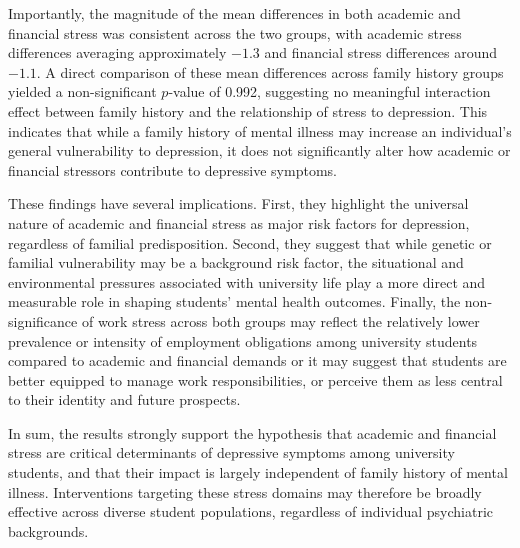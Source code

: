 \documentclass[conference]{IEEEtran}
\begin{document}
Importantly, the magnitude of the mean differences in both academic and financial stress was consistent across the two groups, with academic stress differences averaging approximately $-1.3$ and financial stress differences around $-1.1$. A direct comparison of these mean differences across family history groups yielded a non-significant $p$-value of 0.992, suggesting no meaningful interaction effect between family history and the relationship of stress to depression. This indicates that while a family history of mental illness may increase an individual's general vulnerability to depression, it does not significantly alter how academic or financial stressors contribute to depressive symptoms.

These findings have several implications. First, they highlight the universal nature of academic and financial stress as major risk factors for depression, regardless of familial predisposition. Second, they suggest that while genetic or familial vulnerability may be a background risk factor, the situational and environmental pressures associated with university life play a more direct and measurable role in shaping students’ mental health outcomes. Finally, the non-significance of work stress across both groups may reflect the relatively lower prevalence or intensity of employment obligations among university students compared to academic and financial demands or it may suggest that students are better equipped to manage work responsibilities, or perceive them as less central to their identity and future prospects.

In sum, the results strongly support the hypothesis that academic and financial stress are critical determinants of depressive symptoms among university students, and that their impact is largely independent of family history of mental illness. Interventions targeting these stress domains may therefore be broadly effective across diverse student populations, regardless of individual psychiatric backgrounds.
\end{document}

